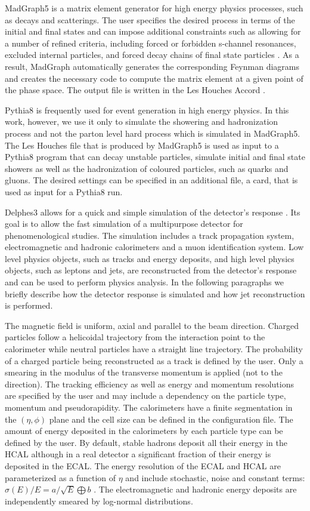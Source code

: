 MadGraph5 is a matrix element generator for high energy physics processes, such as decays and scatterings. The user specifies the desired process in terms of the initial and final states and can impose additional constraints such as allowing for a number of refined criteria, including forced or forbidden s-channel resonances, excluded internal particles, and forced decay chains of final state particles \cite{MG5}. As a result, MadGraph automatically generates the corresponding Feynman diagrams and creates the necessary code to compute the matrix element at a given point of the phase space. The output file is written in the Les Houches Accord \cite{lhe}.

Pythia8 is frequently used for event generation in high energy physics. In this work, however, we use it only to simulate the showering and hadronization process and not the parton level hard process which is simulated in MadGraph5. The Les Houches file that is produced by MadGraph5 is used as input to a Pythia8 program that can decay unstable particles, simulate initial and final state showers as well as the hadronization of coloured particles, such as quarks and gluons. The desired settings can be specified in an additional file, a card, that is used as input for a Pythia8 run.

Delphes3 allows for a quick and simple simulation of the detector's response \cite{Delphes}. Its goal is to allow the fast simulation of a multipurpose detector for phenomenological studies. The simulation includes a track propagation system, electromagnetic and hadronic calorimeters and a muon identification system. Low level physics objects, such as tracks and energy deposits, and high level physics objects, such as leptons and jets, are reconstructed from the detector's response and can be used to perform physics analysis. In the following paragraphs we briefly describe how the detector response is simulated and how jet reconstruction is performed.  

The magnetic field is uniform, axial and parallel to the beam direction. Charged particles follow a helicoidal trajectory from the interaction point to the calorimeter while neutral particles have a straight line trajectory. The probability of a charged particle being reconstructed as a track is defined by the user. Only a smearing in the modulus of the transverse momentum is applied (not to the direction). The tracking efficiency as well as energy and momentum resolutions are specified by the user and may include a dependency on the particle type, momentum and pseudorapidity. The calorimeters have a finite segmentation in the $(\eta,\phi)$ plane and the cell size can be defined in the configuration file. The amount of energy deposited in the calorimeters by each particle type can be defined by the user. By default, stable hadrons deposit all their energy in the HCAL although in a real detector a significant fraction of their energy is deposited in the ECAL. The energy resolution of the ECAL and HCAL are parameterized as a function of $\eta$ and include stochastic, noise and constant terms: $\sigma (E)/E=a/\sqrt{E}\bigoplus b$ . The electromagnetic and hadronic energy deposits are independently smeared by log-normal distributions. 


